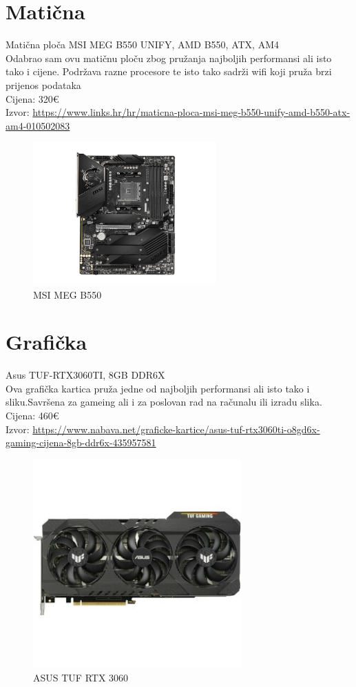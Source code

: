 \documentclass{report}
\begin{document}
\chapter{Matična}
Matična ploča MSI MEG B550 UNIFY, AMD B550, ATX, AM4
\\Odabrao sam ovu matičnu ploču zbog pružanja najboljih performansi ali isto tako i cijene. Podržava razne procesore te isto tako sadrži wifi koji pruža brzi prijenos podataka
\\Cijena: 320€
\\Izvor:  \url{https://www.links.hr/hr/maticna-ploca-msi-meg-b550-unify-amd-b550-atx-am4-010502083}
\begin{figure}[h]
\includegraphics[width=7cm]{slike/maticna.jpg}
\caption{MSI MEG B550}
\end{figure}

\chapter{Grafička}
Asus TUF-RTX3060TI, 8GB DDR6X
\\Ova grafička kartica pruža jedne od najboljih performansi ali isto tako i sliku.Savršena za gameing ali i za poslovan rad na računalu ili izradu slika.
\\Cijena: 460€
\\Izvor:  \url{https://www.nabava.net/graficke-kartice/asus-tuf-rtx3060ti-o8gd6x-gaming-cijena-8gb-ddr6x-435957581}
\begin{figure}[h]
\includegraphics[width=8cm]{slike/graficka.jpg}
\caption{ASUS TUF RTX 3060}
\end{figure}
\end{document}
